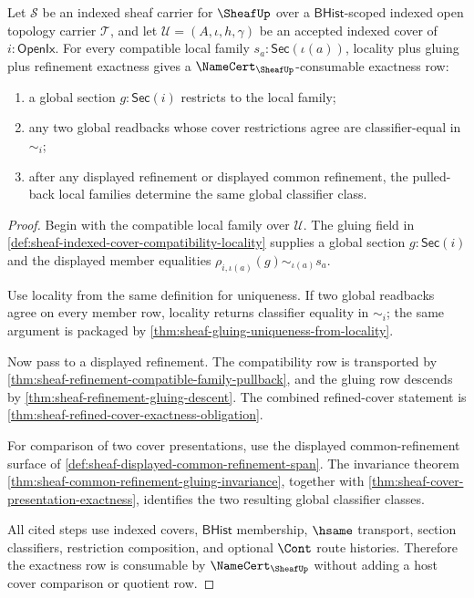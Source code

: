 \begin{theorem}
\label{thm:sheaf-root-face-gluing-exactness}
Let $\mathcal{S}$ be an indexed sheaf carrier for $\SheafUp$ over a $\mathsf{BHist}$-scoped indexed open topology carrier $\mathcal{T}$, and let $\mathcal{U}=(A,\iota,h,\gamma)$ be an accepted indexed cover of $i:\mathsf{OpenIx}$. For every compatible local family $s_a:\mathsf{Sec}(\iota(a))$, locality plus gluing plus refinement exactness gives a $\NameCert_{\SheafUp}$-consumable exactness row:
\begin{enumerate}
\item a global section $g:\mathsf{Sec}(i)$ restricts to the local family;
\item any two global readbacks whose cover restrictions agree are classifier-equal in $\sim_i$;
\item after any displayed refinement or displayed common refinement, the pulled-back local families determine the same global classifier class.
\end{enumerate}
\end{theorem}
\begin{proof}
Begin with the compatible local family over $\mathcal{U}$. The gluing field in \autoref{def:sheaf-indexed-cover-compatibility-locality} supplies a global section $g:\mathsf{Sec}(i)$ and the displayed member equalities $\rho_{i,\iota(a)}(g)\sim_{\iota(a)}s_a$.

Use locality from the same definition for uniqueness. If two global readbacks agree on every member row, locality returns classifier equality in $\sim_i$; the same argument is packaged by \autoref{thm:sheaf-gluing-uniqueness-from-locality}.

Now pass to a displayed refinement. The compatibility row is transported by \autoref{thm:sheaf-refinement-compatible-family-pullback}, and the gluing row descends by \autoref{thm:sheaf-refinement-gluing-descent}. The combined refined-cover statement is \autoref{thm:sheaf-refined-cover-exactness-obligation}.

For comparison of two cover presentations, use the displayed common-refinement surface of \autoref{def:sheaf-displayed-common-refinement-span}. The invariance theorem \autoref{thm:sheaf-common-refinement-gluing-invariance}, together with \autoref{thm:sheaf-cover-presentation-exactness}, identifies the two resulting global classifier classes.

All cited steps use indexed covers, $\mathsf{BHist}$ membership, $\hsame$ transport, section classifiers, restriction composition, and optional $\Cont$ route histories. Therefore the exactness row is consumable by $\NameCert_{\SheafUp}$ without adding a host cover comparison or quotient row.
\end{proof}

